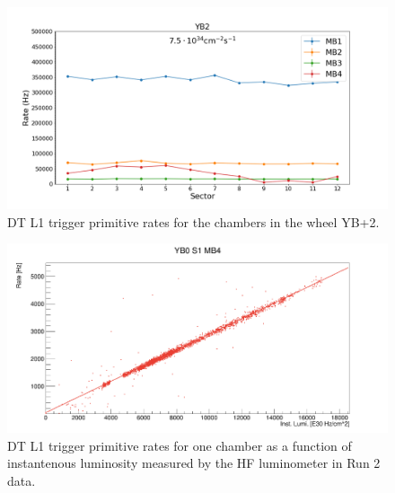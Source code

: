 \begin{figure}[hbtp]
\centering
\includegraphics[width=.7\linewidth]{tex/Part2/fig/DT/DT-RatesExtrapolated.png}
\caption{DT L1 trigger primitive rates for the chambers in the wheel YB+2.} 
\label{fig:DT_rates}
\end{figure}


\begin{figure}[hbtp]
\centering
\includegraphics[width=.7\linewidth]{tex/Part2/fig/DT/DT-Linearity.png}
\caption{DT L1 trigger primitive rates for one chamber  as a function of instantenous luminosity measured by the HF luminometer in Run 2 data.} 
\label{fig:DT_linearity}
\end{figure}
